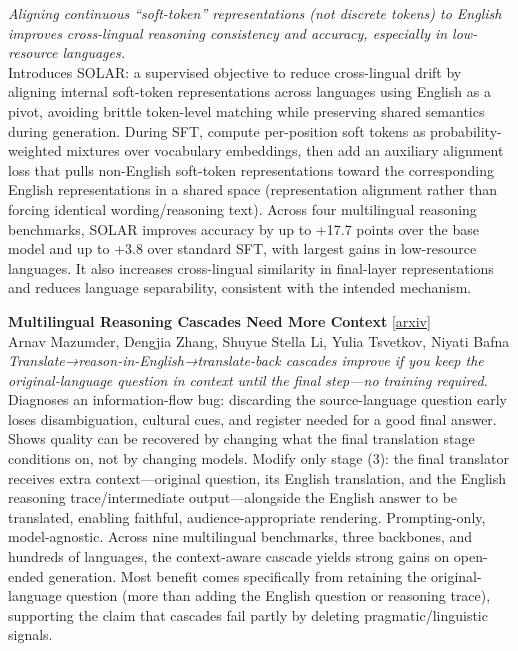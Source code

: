 \documentclass[12pt,letterpaper]{article}
\begin{document}
{\small\textit{Aligning continuous ``soft-token'' representations (not discrete tokens) to English improves cross-lingual reasoning consistency and accuracy, especially in low-resource languages.}}\\[1pt]
{\footnotesize Introduces SOLAR: a supervised objective to reduce cross-lingual drift by aligning internal soft-token representations across languages using English as a pivot, avoiding brittle token-level matching while preserving shared semantics during generation. During SFT, compute per-position soft tokens as probability-weighted mixtures over vocabulary embeddings, then add an auxiliary alignment loss that pulls non-English soft-token representations toward the corresponding English representations in a shared space (representation alignment rather than forcing identical wording/reasoning text). Across four multilingual reasoning benchmarks, SOLAR improves accuracy by up to +17.7 points over the base model and up to +3.8 over standard SFT, with largest gains in low-resource languages. It also increases cross-lingual similarity in final-layer representations and reduces language separability, consistent with the intended mechanism.}

\medskip

{\small\textbf{Multilingual Reasoning Cascades Need More Context}} {\scriptsize[\href{https://arxiv.org/abs/2606.27306}{arxiv}]}\\
{\scriptsize Arnav Mazumder, Dengjia Zhang, Shuyue Stella Li, Yulia Tsvetkov, Niyati Bafna}\\

{\small\textit{Translate→reason-in-English→translate-back cascades improve if you keep the original-language question in context until the final step---no training required.}}\\[1pt]
{\footnotesize Diagnoses an information-flow bug: discarding the source-language question early loses disambiguation, cultural cues, and register needed for a good final answer. Shows quality can be recovered by changing what the final translation stage conditions on, not by changing models. Modify only stage (3): the final translator receives extra context---original question, its English translation, and the English reasoning trace/intermediate output---alongside the English answer to be translated, enabling faithful, audience-appropriate rendering. Prompting-only, model-agnostic. Across nine multilingual benchmarks, three backbones, and hundreds of languages, the context-aware cascade yields strong gains on open-ended generation. Most benefit comes specifically from retaining the original-language question (more than adding the English question or reasoning trace), supporting the claim that cascades fail partly by deleting pragmatic/linguistic signals.}
\end{document}

